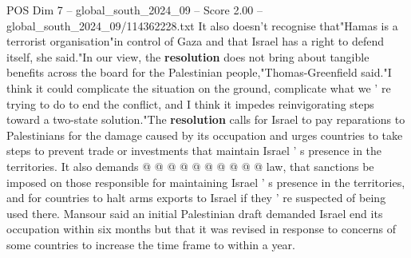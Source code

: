 \begin{textsample}{POS Dim 7 – global\_south\_2024\_09 – Score 2.00 – global\_south\_2024\_09/114362228.txt}
It also doesn't recognise that"Hamas is a terrorist organisation"in control of Gaza and that Israel has a right to defend itself, she said."In our view, the \textbf{resolution} does not bring about tangible benefits across the board for the Palestinian people,"Thomas-Greenfield said."I think it could complicate the situation on the ground, complicate what we ' re trying to do to end the conflict, and I think it impedes reinvigorating steps toward a two-state solution."The \textbf{resolution} calls for Israel to pay reparations to Palestinians for the damage caused by its occupation and urges countries to take steps to prevent trade or investments that maintain Israel ' s presence in the territories.
It also demands @ @ @ @ @ @ @ @ @ @ law, that sanctions be imposed on those responsible for maintaining Israel ' s presence in the territories, and for countries to halt arms exports to Israel if they ' re suspected of being used there.
Mansour said an initial Palestinian draft demanded Israel end its occupation within six months but that it was revised in response to concerns of some countries to increase the time frame to within a year.

\end{textsample}
